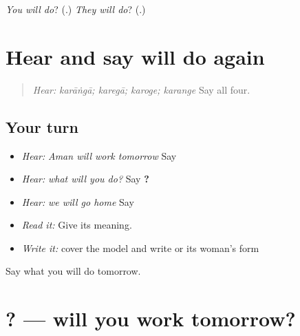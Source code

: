 \begin{tcolorbox}[breakable,colback=teal!4,colframe=teal!35!black,title={Before you move on}]
\emph{You will do}? (\textbf{}.) \emph{They will do}? (\textbf{}.)
\end{tcolorbox}
\section[\texorpdfstring{\pa{ਕਰਾਂਗਾ} · \pa{ਕਰੇਗਾ} … (karāṅgā · karegā …)}{ਕਰਾਂਗਾ · ਕਰੇਗਾ … (karāṅgā · karegā …)}]{Hear and say will do again}

\label{lesson:PA-C222-karanga-review}



\begin{quote}
\emph{Hear:} \emph{karāṅgā; karegā; karoge; karange} Say all four.
\end{quote}

\subsection*{Your turn}
\begin{itemize}
\raggedright
  \item \emph{Hear:} \emph{Aman will work tomorrow} Say \textbf{   }
  \item \emph{Hear:} \emph{what will you do?} Say \textbf{  ?}
  \item \emph{Hear:} \emph{we will go home} Say \textbf{  }
  \item \emph{Read it:} \textbf{  } Give its meaning.
  \item \emph{Write it:} cover the model and write \textbf{  } or its woman's form
\end{itemize}

\begin{tcolorbox}[breakable,colback=teal!4,colframe=teal!35!black,title={Before you move on}]
Say what you will do tomorrow.
\end{tcolorbox}
\section[\texorpdfstring{\pa{ਕੀ} \pa{ਤੁਸੀਂ} \pa{ਕੱਲ੍ਹ} \pa{ਕੰਮ} \pa{ਕਰੋਗੇ}? (kī tusīṁ kallh …)}{ਕੀ ਤੁਸੀਂ ਕੱਲ੍ਹ ਕੰਮ ਕਰੋਗੇ? (kī tusīṁ kallh …)}]{    ? — will you work tomorrow?}


